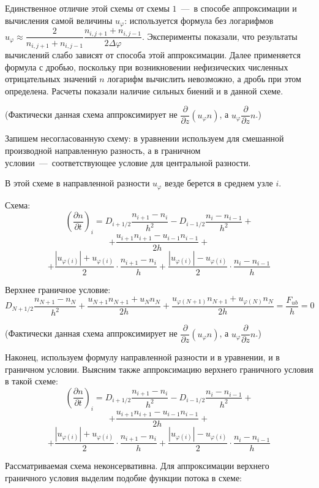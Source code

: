 \documentclass[2pt, a4paper, fleqn]{extarticle}
\begin{document}
 Единственное отличие этой схемы от схемы $1$~---~в способе аппроксимации и вычисления самой величины $u_\varphi$: используется формула без логарифмов $u_\varphi \approx \dfrac{2}{n_{i, j+1}+n_{i, j-1}}\dfrac{n_{i, j+1}+n_{i, j-1}}{2\Delta\varphi}$. Эксперименты показали, что результаты вычислений слабо зависят от способа этой аппроксимации. Далее применяется формула с дробью, поскольку при возникновении нефизических численных отрицательных значений $n$ логарифм вычислить невозможно, а дробь при этом определена. Расчеты показали наличие сильных биений и в данной схеме.

\medskip

 (Фактически данная схема аппроксимирует не $\dfrac{\partial}{\partial z} (u_\varphi n)$, а $u_\varphi\dfrac{\partial}{\partial z} n$.)

Запишем несогласованную схему: в уравнении используем для смешанной производной направленную разность, а в граничном условии~---~соответствующее условие для центральной разности.

В этой схеме в направленной разности $u_\varphi$ везде берется в среднем узле $i$.

Схема: $$\left(\dfrac{\partial n}{\partial t}\right)_i = D_{i+1/2}\dfrac{n_{i+1}-n_i}{h^2} - D_{i-1/2}\dfrac{n_{i}-n_{i-1}}{h^2}+$$ $$+\dfrac{u_{i+1}n_{i+1}-u_{i-1}n_{i-1}}{2h} + $$ $$+\dfrac{|u_{\varphi(i)}|+u_{\varphi(i)}}{2}\cdot\dfrac{n_{i+1}-n_i}{h}+\dfrac{|u_{\varphi(i)}|-u_{\varphi(i)}}{2}\cdot\dfrac{n_i-n_{i-1}}{h}$$

Верхнее граничное условие: $$D_{N+1/2}\dfrac{n_{N+1}-n_{N}}{h^2}+\dfrac{u_{N+1}n_{N+1}+u_{N}n_{N}}{2h}+\dfrac{u_{\varphi(N+1)}n_{N+1}+u_{\varphi(N)}n_{N}}{2h} = \dfrac{F_{ub}}{h} = 0$$

\medskip

 (Фактически данная схема аппроксимирует не $\dfrac{\partial}{\partial z} (u_\varphi n)$, а $u_\varphi\dfrac{\partial}{\partial z} n$.)

Наконец, используем формулу направленной разности и в уравнении, и в граничном условии. Выясним также аппроксимацию верхнего граничного условия в такой схеме: $$\left(\dfrac{\partial n}{\partial t}\right)_i = D_{i+1/2}\dfrac{n_{i+1}-n_i}{h^2} - D_{i-1/2}\dfrac{n_{i}-n_{i-1}}{h^2}+$$ $$+\dfrac{u_{i+1}n_{i+1}-u_{i-1}n_{i-1}}{2h} + $$ $$+\dfrac{|u_{\varphi(i)}|+u_{\varphi(i)}}{2}\cdot\dfrac{n_{i+1}-n_i}{h}+\dfrac{|u_{\varphi(i)}|-u_{\varphi(i)}}{2}\cdot\dfrac{n_i-n_{i-1}}{h}$$

Рассматриваемая схема неконсервативна. Для аппроксимации верхнего граничного условия выделим подобие функции потока в схеме:
\end{document}
